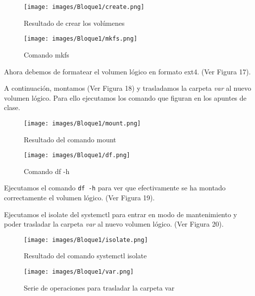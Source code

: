 \begin{figure}[htbp]
  \centering
  \begin{minipage}[b]{0.45\textwidth}
      \centering
      \texttt{[image: images/Bloque1/create.png]}
      \caption{Resultado de crear los volúmenes}
  \end{minipage}
  \hfill
  \begin{minipage}[b]{0.45\textwidth}
      \centering
      \texttt{[image: images/Bloque1/mkfs.png]}
      \caption{Comando mkfs}
  \end{minipage}
\end{figure}

Ahora debemos de formatear el volumen lógico en formato ext4. (Ver Figura 17).

A continuación, montamos (Ver Figura 18) y trasladamos la carpeta \textit{var} al nuevo volumen lógico. Para ello ejecutamos los comando que figuran en los apuntes de clase.

\begin{figure}[htbp]
  \centering
  \begin{minipage}[b]{0.45\textwidth}
      \centering
      \texttt{[image: images/Bloque1/mount.png]}
      \caption{Resultado del comando mount}
  \end{minipage}
  \hfill
  \begin{minipage}[b]{0.45\textwidth}
      \centering
      \texttt{[image: images/Bloque1/df.png]}
      \caption{Comando df -h}
  \end{minipage}
\end{figure}

  Ejecutamos el comando \texttt{df -h} para ver que efectivamente se ha montado correctamente el volumen lógico. (Ver Figura 19).

  Ejecutamos el isolate del systemctl para entrar en modo de mantenimiento y poder trasladar la carpeta \textit{var} al nuevo volumen lógico. (Ver Figura 20).

  \begin{figure}[htbp]
    \centering
    \begin{minipage}[b]{0.45\textwidth}
        \centering
        \texttt{[image: images/Bloque1/isolate.png]}
        \caption{Resultado del comando systemctl isolate}
    \end{minipage}
    \hfill
    \begin{minipage}[b]{0.45\textwidth}
        \centering
        \texttt{[image: images/Bloque1/var.png]}
        \caption{Serie de operaciones para trasladar la carpeta var}
    \end{minipage}
  \end{figure}

